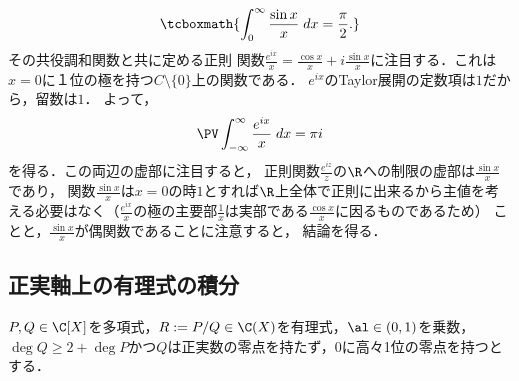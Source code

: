 \documentclass[uplatex, dvipdfmx]{jsreport}
\begin{document}
\begin{example}
    \[\tcboxmath{\int^\infty_0\frac{\sin x}{x}\;dx=\frac{\pi}{2}.}\]
    その共役調和関数と共に定める正則
    関数$\frac{e^{ix}}{x}=\frac{\cos x}{x}+i\frac{\sin x}{x}$に注目する．これは$x=0$に１位の極を持つ$C\setminus\{0\}$上の関数である．
    $e^{ix}$のTaylor展開の定数項は$1$だから，留数は$1$．
    よって，
    \[\PV\int^\infty_{-\infty}\frac{e^{ix}}{x}\;dx=\pi i\]
    を得る．この両辺の虚部に注目すると，
    正則関数$\frac{e^{iz}}{z}$の$\R$への制限の虚部は$\frac{\sin x}{x}$であり，
    関数$\frac{\sin x}{x}$は$x=0$の時$1$とすれば$\R$上全体で正則に出来るから主値を考える必要はなく（$\frac{e^{ix}}{x}$の極の主要部$\frac{1}{x}$は実部である$\frac{\cos x}{x}$に因るものであるため）
    ことと，$\frac{\sin x}{x}$が偶関数であることに注意すると，
    結論を得る．
\end{example}

\subsection{正実軸上の有理式の積分}

\begin{notation}
    $P,Q\in\C[X]$を多項式，$R:=P/Q\in\C(X)$を有理式，$\al\in(0,1)$を乗数，
    $\deg Q\ge 2+\deg P$かつ$Q$は正実数の零点を持たず，$0$に高々1位の零点を持つとする．
\end{notation}
\end{document}
